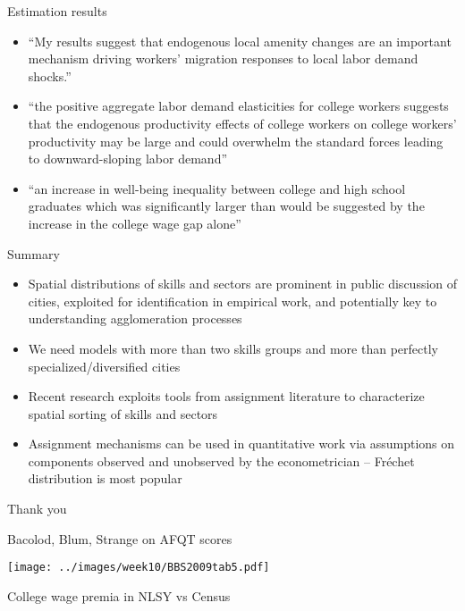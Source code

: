 \documentclass[10pt,notes=hide]{beamer}
\newcommand{\beginbackup}{
   \newcounter{framenumbervorappendix}
   \setcounter{framenumbervorappendix}{\value{framenumber}}
}
\begin{document}
\begin{frame}{Estimation results}
\begin{itemize}
	\item ``My results suggest that endogenous local amenity changes are an important mechanism driving workers' migration responses to local labor demand shocks.''
	\item ``the positive aggregate labor demand elasticities for college workers suggests that the endogenous productivity effects of college workers on college workers' productivity may be large and could overwhelm the standard forces leading to downward-sloping labor demand''
	\item ``an increase in well-being inequality between college and high school graduates which was significantly larger than would be suggested by the increase in the college wage gap alone''
\end{itemize}
\end{frame}
\begin{frame}{Summary}
\begin{itemize}
	\item Spatial distributions of skills and sectors are prominent in public discussion of cities, exploited for identification in empirical work, and potentially key to understanding agglomeration processes
	\item We need models with more than two skills groups and more than perfectly specialized/diversified cities
	\item Recent research exploits tools from assignment literature to characterize spatial sorting of skills and sectors
	\item Assignment mechanisms can be used in quantitative work via assumptions on components observed and unobserved by the econometrician -- Fr\'{e}chet distribution is most popular
\end{itemize}
\end{frame}
\begin{frame}
\begin{center}\Large{Thank you}\end{center}
\end{frame}
\beginbackup
\begin{frame}{Bacolod, Blum, Strange on AFQT scores}
\hypertarget{BBS2009tab5}{}
\begin{center}\texttt{[image: ../images/week10/BBS2009tab5.pdf]}\end{center}
\hyperlink{NLSY_main}{\beamerreturnbutton}
\end{frame}
\begin{frame}{College wage premia in NLSY vs Census}
\hypertarget{BSPvsCensus}{}

\hyperlink{NLSY_main}{\beamerreturnbutton}
\end{frame}
\end{document}
